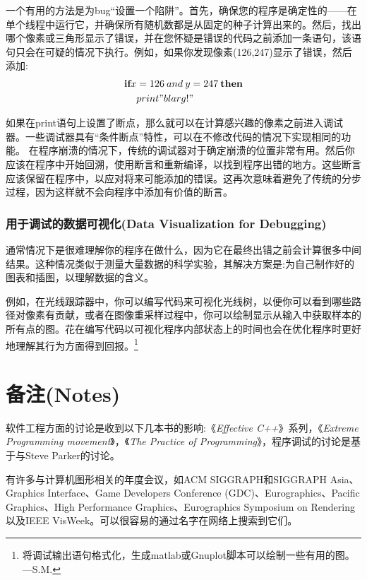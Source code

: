 一个有用的方法是为bug“设置一个陷阱”。首先，确保您的程序是确定性的——在单个线程中运行它，并确保所有随机数都是从固定的种子计算出来的。然后，找出哪个像素或三角形显示了错误，并在您怀疑是错误的代码之前添加一条语句，该语句只会在可疑的情况下执行。例如，如果你发现像素(126,247)显示了错误，然后添加:
\begin{equation}
	\begin{aligned}	
		\textbf{if} x &= 126 \: and \: y=247 \: \textbf{then} \\
		&print "blarg!"
	\end{aligned}
\end{equation}

如果在print语句上设置了断点，那么就可以在计算感兴趣的像素之前进入调试器。一些调试器具有“条件断点”特性，可以在不修改代码的情况下实现相同的功能。
在程序崩溃的情况下，传统的调试器对于确定崩溃的位置非常有用。然后你应该在程序中开始回溯，使用断言和重新编译，以找到程序出错的地方。这些断言应该保留在程序中，以应对将来可能添加的错误。这再次意味着避免了传统的分步过程，因为这样就不会向程序中添加有价值的断言。

\subsubsection*{\textcolor{structure3}{用于调试的数据可视化(Data Visualization for Debugging)}}

通常情况下是很难理解你的程序在做什么，因为它在最终出错之前会计算很多中间结果。这种情况类似于测量大量数据的科学实验，其解决方案是:为自己制作好的图表和插图，以理解数据的含义。

例如，在光线跟踪器中，你可以编写代码来可视化光线树，以便你可以看到哪些路径对像素有贡献，或者在图像重采样过程中，你可以绘制显示从输入中获取样本的所有点的图。花在编写代码以可视化程序内部状态上的时间也会在优化程序时更好地理解其行为方面得到回报。\footnote{将调试输出语句格式化，生成matlab或Gnuplot脚本可以绘制一些有用的图。—S.M.}

\section*{备注(Notes)}

软件工程方面的讨论是收到以下几本书的影响:《\textit{Effective C++}》系列，《\textit{Extreme Programming movement}》，《\textit{The Practice of Programming}》，程序调试的讨论是基于与Steve Parker的讨论。

有许多与计算机图形相关的年度会议，如ACM SIGGRAPH和SIGGRAPH Asia、Graphics Interface、Game Developers Conference (GDC)、Eurographics、Pacific Graphics、High Performance Graphics、Eurographics Symposium on Rendering以及IEEE VisWeek。可以很容易的通过名字在网络上搜索到它们。



